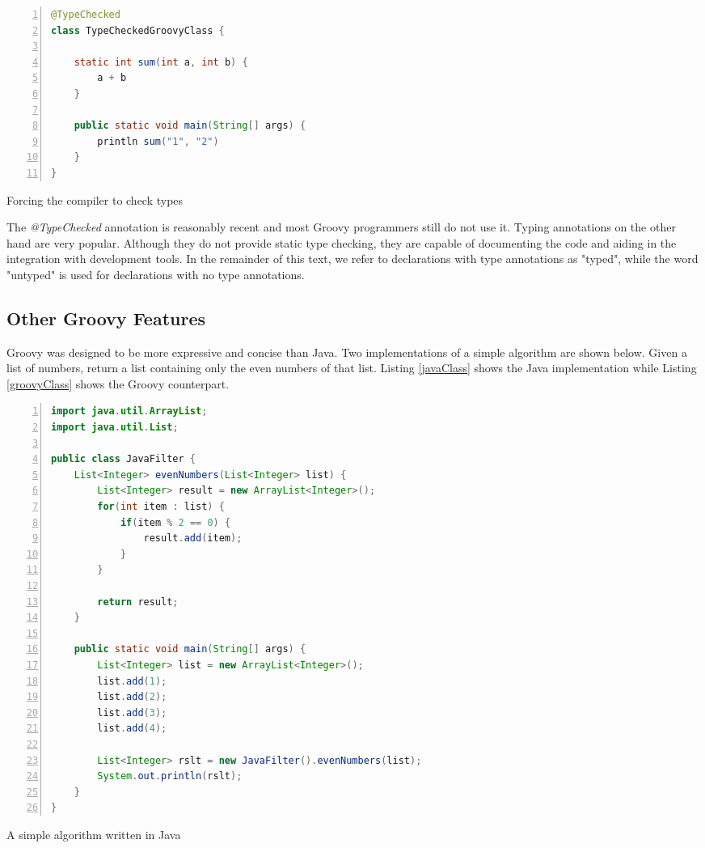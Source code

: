 \documentclass[msc]{ppgccufmg}
\begin{document}
\begin{Listing}[ht]
\begin{lstlisting}[basicstyle=\ttfamily, language=Java,tabsize=2,breaklines=true,numbers=left]
@TypeChecked
class TypeCheckedGroovyClass {
	
	static int sum(int a, int b) {
		a + b
	}

	public static void main(String[] args) {
		println sum("1", "2")
	}
}
\end{lstlisting}
\caption{Forcing the compiler to check types}
\label{staticTyping}
\end{Listing}

The \emph{@TypeChecked} annotation is reasonably recent and most Groovy programmers still do not use it. 
Typing annotations on the other hand are very popular.
Although they do not provide static type checking, they are capable of documenting the code and aiding in the integration with development tools.
In the remainder of this text, we refer to declarations with type annotations as "typed", while the word "untyped" is used for declarations with no type annotations.

\subsection{Other Groovy Features}
Groovy was designed to be more expressive and concise than Java.
Two implementations of a simple algorithm are shown below.
Given a list of numbers, return a list containing only the even numbers of that list.
Listing \ref{javaClass} shows the Java implementation while Listing \ref{groovyClass} shows the Groovy counterpart. 


\begin{Listing}[ht]
\begin{lstlisting}[basicstyle=\ttfamily, language=Java,tabsize=2,breaklines=true,numbers=left]
import java.util.ArrayList;
import java.util.List;

public class JavaFilter {
	List<Integer> evenNumbers(List<Integer> list) {
		List<Integer> result = new ArrayList<Integer>();
		for(int item : list) {
			if(item % 2 == 0) {
				result.add(item);
			}
		}

		return result;
	}

	public static void main(String[] args) {
		List<Integer> list = new ArrayList<Integer>();
		list.add(1);
		list.add(2);
		list.add(3);
		list.add(4);

		List<Integer> rslt = new JavaFilter().evenNumbers(list);
		System.out.println(rslt);
	}
}
\end{lstlisting}
\caption{A simple algorithm written in Java}
\label{javaClass}
\end{Listing}
\end{document}
